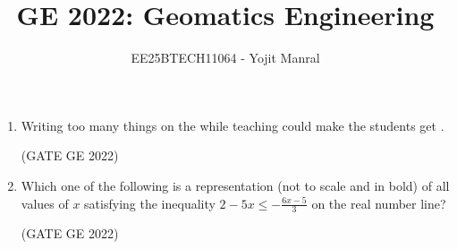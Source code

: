 \documentclass[journal,12pt,onecolumn]{IEEEtran}
\title{GE 2022: Geomatics Engineering}
\author{EE25BTECH11064 - Yojit Manral}
\theoremstyle{remark}
\begin{document}
\maketitle

\begin{enumerate}

\item Writing too many things on the \makebox[1cm]{\hrulefill} while teaching could make the students get \makebox[1cm]{\hrulefill}.

\hfill (GATE GE 2022)

\begin{enumerate}
\end{enumerate}

\item Which one of the following is a representation (not to scale and in bold) of all values of $x$ satisfying the inequality $2 - 5x \leq -\frac{6x - 5}{3}$ on the real number line?

\hfill (GATE GE 2022)


\end{enumerate}
\end{document}
